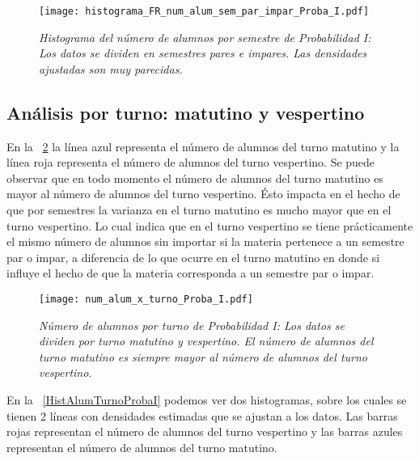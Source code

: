 \begin{figure}[H]
\centering
\texttt{[image: histograma\_FR\_num\_alum\_sem\_par\_impar\_Proba\_I.pdf]} %
\caption[\textit{Histograma del número de alumnos por semestre: Probabilidad I}]{\textit{Histograma del número de alumnos por semestre  de Probabilidad I: Los datos se dividen en semestres pares e impares. Las densidades ajustadas son muy parecidas.}}\label{HistAlumParImparProbaI}
\end{figure}

\pagebreak %

\subsection{Análisis por turno: matutino y vespertino}

En la \figurename{~\ref{num_alum_x_turno_Proba_I}} la línea azul representa el número de alumnos del turno matutino y la línea roja representa el número de alumnos del turno vespertino. Se puede observar que en todo momento el número de alumnos del turno matutino es mayor al número de alumnos del turno vespertino. Ésto impacta en el hecho de que por semestres la varianza en el turno matutino es mucho mayor que en el turno vespertino. Lo cual indica que en el turno vespertino se tiene prácticamente el mismo número de alumnos sin importar si la materia pertenece a un semestre par o impar, a diferencia de lo que ocurre en el turno matutino en donde si influye el hecho de que la materia corresponda a un semestre par o impar.


\begin{figure}[h]
\centering
\texttt{[image: num\_alum\_x\_turno\_Proba\_I.pdf]} %
\caption[\textit{Número de alumnos por turno: Probabilidad I}]{\textit{Número de alumnos por turno de Probabilidad I: Los datos se dividen por turno matutino y vespertino. El número de alumnos del turno matutino es siempre mayor al número de alumnos del turno vespertino.}}\label{num_alum_x_turno_Proba_I}
\end{figure}

En la \figurename{~\ref{HistAlumTurnoProbaI}} podemos ver dos histogramas, sobre los cuales se tienen 2 líneas con  densidades estimadas que se ajustan a los datos. Las barras rojas representan el número de alumnos del turno vespertino y las barras azules representan el número de alumnos del turno matutino.

